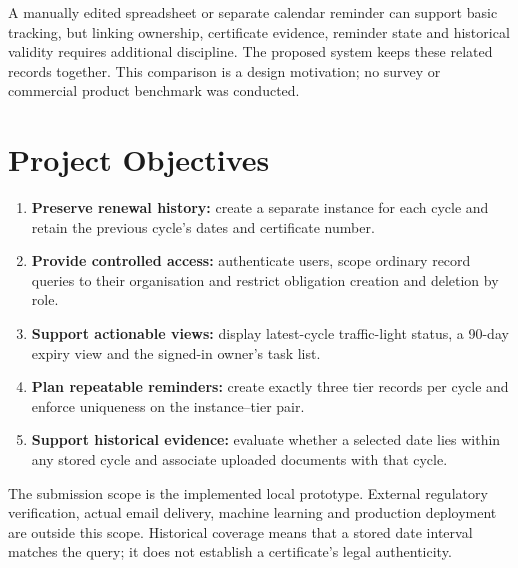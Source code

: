 A manually edited spreadsheet or separate calendar reminder can support basic tracking, but linking ownership, certificate evidence, reminder state and historical validity requires additional discipline. The proposed system keeps these related records together. This comparison is a design motivation; no survey or commercial product benchmark was conducted.

\section{Project Objectives}
\begin{enumerate}
\item \textbf{Preserve renewal history:} create a separate instance for each cycle and retain the previous cycle's dates and certificate number.
\item \textbf{Provide controlled access:} authenticate users, scope ordinary record queries to their organisation and restrict obligation creation and deletion by role.
\item \textbf{Support actionable views:} display latest-cycle traffic-light status, a 90-day expiry view and the signed-in owner's task list.
\item \textbf{Plan repeatable reminders:} create exactly three tier records per cycle and enforce uniqueness on the instance--tier pair.
\item \textbf{Support historical evidence:} evaluate whether a selected date lies within any stored cycle and associate uploaded documents with that cycle.
\end{enumerate}

The submission scope is the implemented local prototype. External regulatory verification, actual email delivery, machine learning and production deployment are outside this scope. Historical coverage means that a stored date interval matches the query; it does not establish a certificate's legal authenticity.
